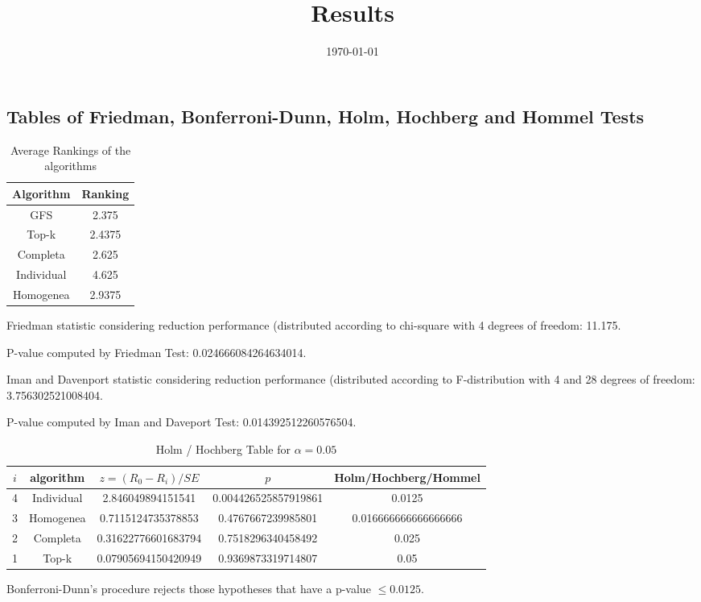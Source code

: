 \documentclass[a4paper,10pt]{article}
\title{Results}
\author{}
\date{\today}
\begin{document}
\begin{landscape}
\oddsidemargin 0in \topmargin 0in\maketitle
\section{Tables of Friedman, Bonferroni-Dunn, Holm, Hochberg and Hommel Tests}
\begin{table}[!htp]
\centering
\caption{Average Rankings of the algorithms
}\begin{tabular}{c|c}
Algorithm&Ranking\\
\hline
GFS&2.375\\
Top-k&2.4375\\
Completa&2.625\\
Individual&4.625\\
Homogenea&2.9375\\
\end{tabular}
\end{table}


Friedman statistic considering reduction performance (distributed according to chi-square with 4 degrees of freedom: 11.175.


P-value computed by Friedman Test: 0.024666084264634014.\newline

Iman and Davenport statistic considering reduction performance (distributed according to F-distribution with 4 and 28 degrees of freedom: 3.756302521008404.


P-value computed by Iman and Daveport Test: 0.014392512260576504.\newline

\begin{table}[!htp]
\centering\tiny
\caption{Holm / Hochberg Table for $\alpha=0.05$}
\begin{tabular}{ccccc}
$i$&algorithm&$z=(R_0 - R_i)/SE$&$p$&Holm/Hochberg/Hommel\\
\hline
4&Individual&2.846049894151541&0.004426525857919861&0.0125\\
3&Homogenea&0.7115124735378853&0.4767667239985801&0.016666666666666666\\
2&Completa&0.31622776601683794&0.7518296340458492&0.025\\
1&Top-k&0.07905694150420949&0.9369873319714807&0.05\\
\hline
\end{tabular}
\end{table}
Bonferroni-Dunn's procedure rejects those hypotheses that have a p-value $\le0.0125$.



\end{landscape}
\end{document}
